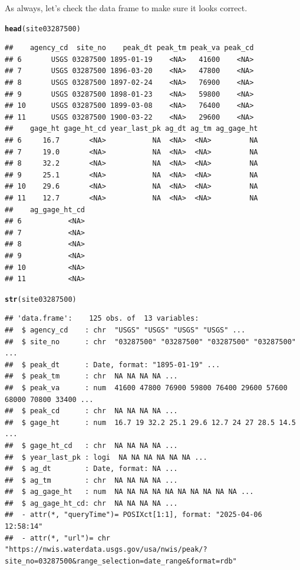 \documentclass{tufte-handout}\usepackage[]{graphicx}\usepackage[]{xcolor}
\makeatletter
\newcommand{\hlstd}[1]{\textcolor[rgb]{0.345,0.345,0.345}{#1}}%
\newcommand{\hlkwd}[1]{\textcolor[rgb]{0.737,0.353,0.396}{\textbf{#1}}}%
\newenvironment{kframe}{%
 \def\at@end@of@kframe{}%
 \ifinner\ifhmode%
  \def\at@end@of@kframe{\end{minipage}}%
  \begin{minipage}{\columnwidth}%
 \fi\fi%
 \def\FrameCommand##1{\hskip\@totalleftmargin \hskip-\fboxsep
 \colorbox{shadecolor}{##1}\hskip-\fboxsep
     \hskip-\linewidth \hskip-\@totalleftmargin \hskip\columnwidth}%
 \MakeFramed {\advance\hsize-\width
   \@totalleftmargin\z@ \linewidth\hsize
   \@setminipage}}%
 {\par\unskip\endMakeFramed%
 \at@end@of@kframe}
\newenvironment{knitrout}{}{} %
\makeatother
\begin{document}
As always, let's check the data frame to make sure it looks correct.

\begin{knitrout}
\color{fgcolor}\begin{kframe}
\begin{alltt}
\hlkwd{head}\hlstd{(site03287500)}
\end{alltt}
\begin{verbatim}
##    agency_cd  site_no    peak_dt peak_tm peak_va peak_cd
## 6       USGS 03287500 1895-01-19    <NA>   41600    <NA>
## 7       USGS 03287500 1896-03-20    <NA>   47800    <NA>
## 8       USGS 03287500 1897-02-24    <NA>   76900    <NA>
## 9       USGS 03287500 1898-01-23    <NA>   59800    <NA>
## 10      USGS 03287500 1899-03-08    <NA>   76400    <NA>
## 11      USGS 03287500 1900-03-22    <NA>   29600    <NA>
##    gage_ht gage_ht_cd year_last_pk ag_dt ag_tm ag_gage_ht
## 6     16.7       <NA>           NA  <NA>  <NA>         NA
## 7     19.0       <NA>           NA  <NA>  <NA>         NA
## 8     32.2       <NA>           NA  <NA>  <NA>         NA
## 9     25.1       <NA>           NA  <NA>  <NA>         NA
## 10    29.6       <NA>           NA  <NA>  <NA>         NA
## 11    12.7       <NA>           NA  <NA>  <NA>         NA
##    ag_gage_ht_cd
## 6           <NA>
## 7           <NA>
## 8           <NA>
## 9           <NA>
## 10          <NA>
## 11          <NA>
\end{verbatim}
\begin{alltt}
\hlkwd{str}\hlstd{(site03287500)}
\end{alltt}
\begin{verbatim}
## 'data.frame':	125 obs. of  13 variables:
##  $ agency_cd    : chr  "USGS" "USGS" "USGS" "USGS" ...
##  $ site_no      : chr  "03287500" "03287500" "03287500" "03287500" ...
##  $ peak_dt      : Date, format: "1895-01-19" ...
##  $ peak_tm      : chr  NA NA NA NA ...
##  $ peak_va      : num  41600 47800 76900 59800 76400 29600 57600 68000 70800 33400 ...
##  $ peak_cd      : chr  NA NA NA NA ...
##  $ gage_ht      : num  16.7 19 32.2 25.1 29.6 12.7 24 27 28.5 14.5 ...
##  $ gage_ht_cd   : chr  NA NA NA NA ...
##  $ year_last_pk : logi  NA NA NA NA NA NA ...
##  $ ag_dt        : Date, format: NA ...
##  $ ag_tm        : chr  NA NA NA NA ...
##  $ ag_gage_ht   : num  NA NA NA NA NA NA NA NA NA NA ...
##  $ ag_gage_ht_cd: chr  NA NA NA NA ...
##  - attr(*, "queryTime")= POSIXct[1:1], format: "2025-04-06 12:58:14"
##  - attr(*, "url")= chr "https://nwis.waterdata.usgs.gov/usa/nwis/peak/?site_no=03287500&range_selection=date_range&format=rdb"

\end{verbatim}
\end{kframe}
\end{knitrout}
\end{document}
